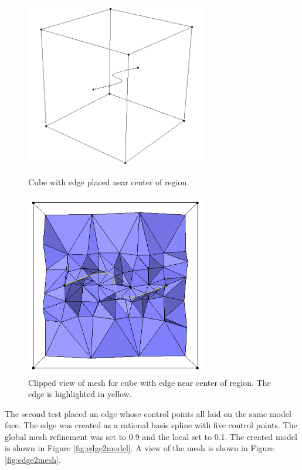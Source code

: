 \documentclass[a4paper, 12pt]{article}
\begin{document}
\begin{figure}[H]
  \centering
  \includegraphics[width=8cm, height=8cm]{test6_smd}
  \caption{Cube with edge placed near center of region.}
  \label{fig:edge1model}
\end{figure}

\begin{figure}[H]
  \centering
  \includegraphics[width=8cm, height=8cm]{test6_sms_clipped}
  \caption{Clipped view of mesh for cube with edge near center of region. 
          The edge is highlighted in yellow.}
  \label{fig:edge1mesh}
\end{figure}

The second test placed an edge whose control points all laid on the same 
model face. 
The edge was created as a rational basis spline with five control points.
The global mesh refinement was set to 0.9 and the local set to 0.1. 
The created model is shown in Figure \ref{fig:edge2model}.
A view of the mesh is shown in Figure \ref{fig:edge2mesh}.
\end{document}
